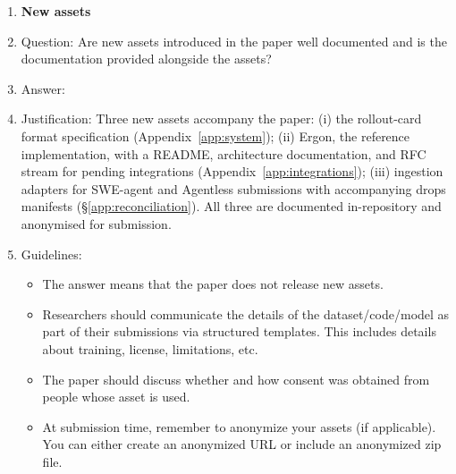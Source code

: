 \begin{enumerate}
\item {\bf New assets}
    \item[] Question: Are new assets introduced in the paper well documented and is the documentation provided alongside the assets?
    \item[] Answer: \answerYes{}
    \item[] Justification: Three new assets accompany the paper: (i) the rollout-card format specification (Appendix~\ref{app:system}); (ii) Ergon, the reference implementation, with a README, architecture documentation, and RFC stream for pending integrations (Appendix~\ref{app:integrations}); (iii) ingestion adapters for SWE-agent and Agentless submissions with accompanying drops manifests (\S\ref{app:reconciliation}). All three are documented in-repository and anonymised for submission.
    \item[] Guidelines:
    \begin{itemize}
        \item The answer \answerNA{} means that the paper does not release new assets.
        \item Researchers should communicate the details of the dataset\slash code\slash model as part of their submissions via structured templates. This includes details about training, license, limitations, etc.
        \item The paper should discuss whether and how consent was obtained from people whose asset is used.
        \item At submission time, remember to anonymize your assets (if applicable). You can either create an anonymized URL or include an anonymized zip file.
    \end{itemize}


\end{enumerate}
